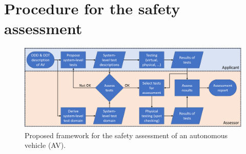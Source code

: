 \section{Procedure for the safety assessment}
\label{sec:procedure}

\begin{figure}
	\centering
	\includegraphics[width=\linewidth]{figures/procedure2}
	\caption{Proposed framework for the safety assessment of an autonomous vehicle (AV).}
	\label{fig:procedure}
\end{figure}

